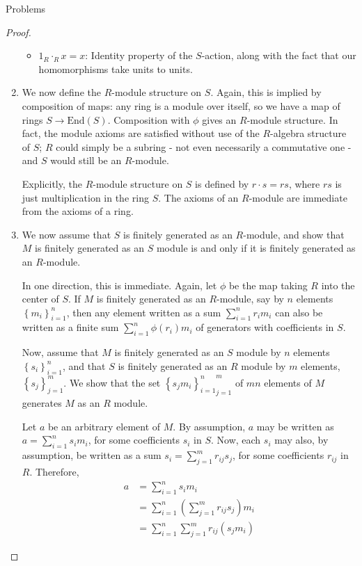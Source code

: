 \documentclass[12pt]{article}
\theoremstyle{definition}
\begin{document}
\begin{section}{Problems}
\begin{proof}
\begin{enumerate}[label=(\alph*)]
\begin{itemize}
				\item $1_R \cdot_R x = x$: Identity property of the $S$-action, along with the fact that our homomorphisms take units to units.
			\end{itemize}
		\item We now define the $R$-module structure on $S$. Again, this is implied by composition of maps: any ring is a module over itself, so we have a map of rings $S \to \text{End}(S)$. Composition with $\phi$ gives an $R$-module structure. In fact, the module axioms are satisfied without use of the $R$-algebra structure of $S$; $R$ could simply be a subring - not even necessarily a commutative one - and $S$ would still be an $R$-module.
			\par Explicitly, the $R$-module structure on $S$ is defined by $r \cdot s= rs$, where $rs$ is just multiplication in the ring $S$. The axioms of an $R$-module are immediate from the axioms of a ring.
		\item We now assume that $S$ is finitely generated as an $R$-module, and show that $M$ is finitely generated as an $S$ module is and only if it is finitely generated as an $R$-module.
			\par In one direction, this is immediate. Again, let $\phi$ be the map taking $R$ into the center of $S$. If $M$ is finitely generated as an $R$-module, say by $n$ elements $\left\{ m_i \right\}_{i = 1}^n$, then any element written as a sum $\sum_{i=1}^n r_i m_i$ can also be written as a finite sum  $\sum_{i=1}^n \phi(r_i) m_i$ of generators with coefficients in $S$.
			\par Now, assume that $M$ is finitely generated as an $S$ module by $n$ elements $\left\{ s_i \right\}_{i=1}^n$, and that $S$ is finitely generated as an $R$ module by $m$ elements, $\left\{ s_j \right\}_{j=1}^m$. We show that the set ${\left\{ s_j m_i \right\}_{i = 1}^n}_{j=1}^m$ of $mn$ elements of $M$ generates $M$ as an $R$ module.
			\par Let $a$ be an arbitrary element of $M$. By assumption, $a$ may be written as $a = \sum_{i=1}^n s_i m_i$, for some coefficients $s_i$ in $S$. Now, each $s_i$ may also, by assumption, be written as a sum $s_i = \sum_{j=1}^m r_{ij} s_j$, for some coefficients $r_{ij}$ in $R$. Therefore,
			\begin{align*}
				a &= \sum_{i=1}^n s_i m_i\\
			&= \sum_{i=1}^n (\sum_{j=1}^m r_{ij} s_j) m_i\\
			&= \sum_{i=1}^n \sum_{j=1}^m r_{ij} (s_j m_i)
			\end{align*}

\end{enumerate}
\end{proof}
\end{section}
\end{document}

